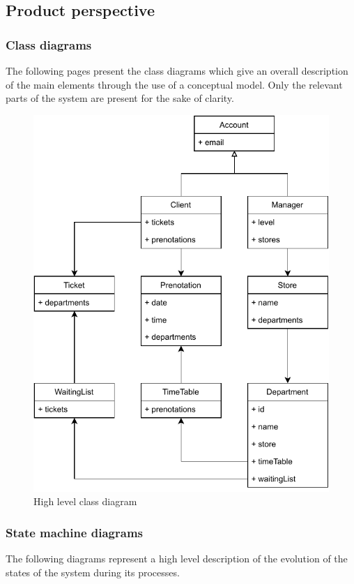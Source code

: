 \subsection{Product perspective}
\subsubsection{Class diagrams}
The following pages present the class diagrams which give an overall description of the main elements through the use of a conceptual model. Only the relevant parts of the system are present for the sake of clarity.
\begin{figure}[H]
    \centering
    \includegraphics{Images/main-class-diag.pdf}
    \caption{\label{fig:metamodel}High level class diagram}
\end{figure}

\newpage
\subsubsection{State machine diagrams}
The following diagrams represent a high level description of the evolution of the states of the system during its processes.

